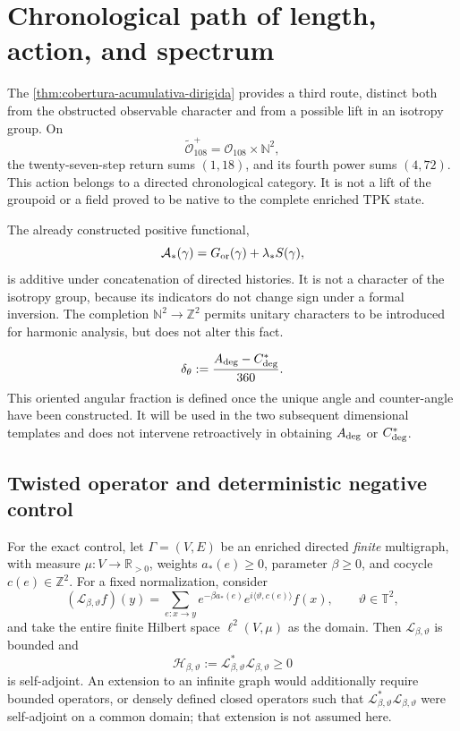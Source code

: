 \section{Chronological path of length, action, and spectrum}
\label{sec:via-cronologica-espectral-G}

The \cref{thm:cobertura-acumulativa-dirigida} provides a third route,
distinct both from the obstructed observable character and from a possible
lift in an isotropy group. On
\[
 \widetilde{\mathcal O}_{108}^{+}
 =\mathcal O_{108}\times\mathbb N^2,
\]
the twenty-seven-step return sums \((1,18)\), and its fourth power sums
\((4,72)\). This action belongs to a directed chronological category. It is not
a lift of the groupoid or a field proved to be native to the complete
enriched TPK state.

The already constructed positive functional,
\[
 \mathcal A_\ast(\gamma)
 =G_{\rm or}(\gamma)+\lambda_\ast S(\gamma),
\]
is additive under concatenation of directed histories. It is not a character of the
isotropy group, because its indicators do not change sign under a
formal inversion. The completion
\(\mathbb N^2\to\mathbb Z^2\) permits unitary characters to be introduced for
harmonic analysis, but does not alter this fact.

\begin{equation}
\label{eq:fraccion-angular-orientada-G}
 \delta_\theta
 :=\frac{A_{\rm deg}-C_{\rm deg}^{\ast}}{360}.
\end{equation}
This oriented angular fraction is defined once the unique angle and
counter-angle have been constructed. It will be used in the two subsequent
dimensional templates and does not intervene retroactively in obtaining
\(A_{\rm deg}\) or \(C_{\rm deg}^{\ast}\).

\subsection{Twisted operator and deterministic negative control}

For the exact control, let \(\Gamma=(V,E)\) be an enriched directed
\emph{finite} multigraph, with measure
\(\mu:V\to\mathbb R_{>0}\), weights \(a_\ast(e)\geq0\), parameter
\(\beta\geq0\), and cocycle
\(c(e)\in\mathbb Z^2\). For a fixed normalization, consider
\[
 (\mathcal L_{\beta,\vartheta}f)(y)
 =
 \sum_{e:x\to y}
 e^{-\beta a_\ast(e)}
 e^{i\langle\vartheta,c(e)\rangle}f(x),
 \qquad
 \vartheta\in\mathbb T^2,
\]
and take the entire finite Hilbert space
\(\ell^2(V,\mu)\) as the domain. Then \(\mathcal L_{\beta,\vartheta}\) is bounded and
\[
 \mathcal H_{\beta,\vartheta}
 :=\mathcal L_{\beta,\vartheta}^{*}
   \mathcal L_{\beta,\vartheta}\geq0
\]
is self-adjoint. An extension to an infinite graph would additionally require
bounded operators, or densely defined closed operators such
that \(\mathcal L_{\beta,\vartheta}^{*}
\mathcal L_{\beta,\vartheta}\) were self-adjoint on a common domain;
that extension is not assumed here.

